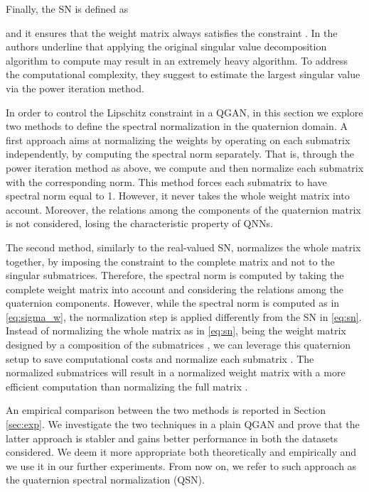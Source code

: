 \documentclass[graybox]{svmult}
\begin{document}
Finally, the SN is defined as



\noindent and it ensures that the weight matrix  always satisfies the constraint . In \cite{Miyato2018SpectralNF} the authors underline that applying the original singular value decomposition algorithm to compute  may result in an extremely heavy algorithm. To address the computational complexity, they suggest to estimate the largest singular value via the power iteration method.

In order to control the Lipschitz constraint in a QGAN, in this section we explore two methods to define the spectral normalization in the quaternion domain. 
A first approach aims at normalizing the weights  by operating on each submatrix  independently, by computing the spectral norm separately. That is, through the power iteration method as above, we compute  and then normalize each submatrix with the corresponding norm. This method forces each submatrix to have spectral norm equal to 1. However, it never takes the whole weight matrix  into account. Moreover, the relations among the components of the quaternion matrix is not considered, losing the characteristic property of QNNs. 

The second method, similarly to the real-valued SN, normalizes the whole matrix  together, by imposing the constraint to the complete matrix and not to the singular submatrices. Therefore, the spectral norm is computed by taking the complete weight matrix into account and considering the relations among the quaternion components. However, while the spectral norm is computed as in \eqref{eq:sigma_w}, the normalization step is applied differently from the SN in \eqref{eq:sn}. Instead of normalizing the whole matrix as in \eqref{eq:sn}, being the weight matrix  designed by a composition of the submatrices , we can leverage this quaternion setup to save computational costs and normalize each submatrix . The normalized submatrices  will result in a normalized weight matrix  with a more efficient computation than normalizing the full matrix .

An empirical comparison between the two methods is reported in Section \ref{sec:exp}. We investigate the two techniques in a plain QGAN and prove that the latter approach is stabler and gains better performance in both the datasets considered. We deem it more appropriate both theoretically and empirically and we use it in our further experiments. From now on, we refer to such approach as the quaternion spectral normalization (QSN).
\end{document}
